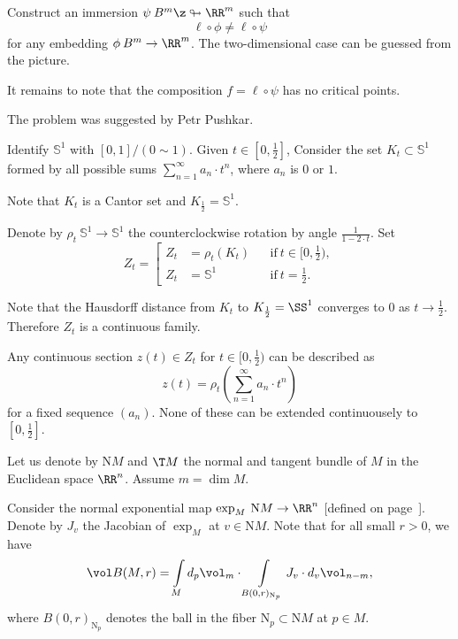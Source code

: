 Construct an immersion 
$\psi\:B^m\z\looparrowright\RR^m$ such that 
\[\ell\circ\phi\ne\ell\circ\psi\]
for any embedding  $\phi\:B^m\to\RR^m$. 
The two-dimensional case can be guessed from the picture.

It remains to note that the composition $f=\ell\circ\psi$ has no critical points.\qeds

The problem was suggested by Petr Pushkar.














Identify $\mathbb{S}^1$ with $[0,1]/(0\sim 1)$.
Given $t\in[0,\tfrac12]$,
Consider the set $K_t\subset \mathbb{S}^1$
formed by all possible sums $\sum_{n=1}^\infty a_n\cdot t^n$,
where $a_n$ is $0$ or $1$.

Note that $K_{t}$ is a Cantor set and $K_{\frac12}=\mathbb{S}^1$.

Denote by $\rho_t\:\mathbb{S}^1\to\mathbb{S}^1$ 
the counterclockwise rotation by angle $\frac1{1-2\cdot t}$.
Set 
\[Z_t=\left[\begin{aligned}
             Z_t&=\rho_t(K_t)&&\text{if}\ t\in[0,\tfrac12),
\\
Z_{t}&=\mathbb{S}^1&&\text{if}\ t=\tfrac12.
            \end{aligned}
\right.
\]

Note that the Hausdorff distance from $K_t$ to $K_{\frac12}=\SS^1$ converges to $0$ as $t\to\tfrac12$.
Therefore $Z_t$ is a continuous family.

Any continuous section $z(t)\in Z_t$ for $t\in[0,\tfrac12)$ can be described as
\[z(t)=\rho_t\left(\sum_{n=1}^\infty a_n\cdot t^n\right)\]
for a fixed sequence $(a_n)$.
None of these can be extended continuousely to $[0,\tfrac12]$.\qeds












Let us denote by $\mathrm{N} M$ and $\T M$ the normal and tangent bundle of $M$ in the Euclidean space $\RR^n$.
Assume $m=\dim M$.

Consider the normal exponential map $\exp_M\:\mathrm{N} M\to\RR^n$ [defined on page~\pageref{page:Normal exponential map}]. Denote by $J_v$ the Jacobian of $\exp_M$ at $v\in \mathrm{N}M$.
Note that for all small $r>0$, we have
\[\vol B(M,r)=\int\limits_M d_p\vol_m\cdot\int\limits_{B(0,r)_{\mathrm{N}_p}}J_v\cdot d_v\vol_{n-m},\]
where $B(0,r)_{\mathrm{N}_p}$ denotes the ball in the fiber $\mathrm{N}_p\subset \mathrm{N} M$ at $p\in M$.

